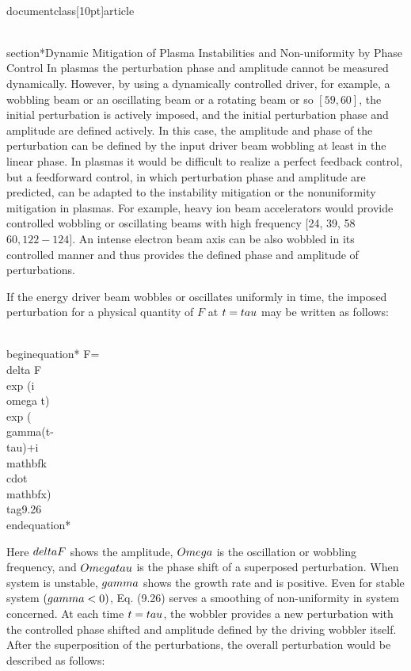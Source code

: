 \\documentclass[10pt]{article}
\begin{document}
{{{{{{\\section*{Dynamic Mitigation of Plasma Instabilities and Non-uniformity by Phase Control}
In plasmas the perturbation phase and amplitude cannot be measured dynamically. However, by using a dynamically controlled driver, for example, a wobbling beam or an oscillating beam or a rotating beam or so $[59,60]$, the initial perturbation is actively imposed, and the initial perturbation phase and amplitude are defined actively. In this case, the amplitude and phase of the perturbation can be defined by the input driver beam wobbling at least in the linear phase. In plasmas it would be difficult to realize a perfect feedback control, but a feedforward control, in which perturbation phase and amplitude are predicted, can be adapted to the instability mitigation or the nonuniformity mitigation in plasmas. For example, heavy ion beam accelerators would provide controlled wobbling or oscillating beams with high frequency [24, 39, 58$60,122-124]$. An intense electron beam axis can be also wobbled in its controlled manner and thus provides the defined phase and amplitude of perturbations.

If the energy driver beam wobbles or oscillates uniformly in time, the imposed perturbation for a physical quantity of $F$ at $t=\\tau$ may be written as follows:


\\begin{equation*}
F=\\delta F \\exp (i \\omega t) \\exp (\\gamma(t-\\tau)+i \\mathbf{k} \\cdot \\mathbf{x}) \\tag{9.26}
\\end{equation*}


Here $\\delta F$ shows the amplitude, $\\Omega$ is the oscillation or wobbling frequency, and $\\Omega \\tau$ is the phase shift of a superposed perturbation. When system is unstable, $\\gamma$ shows the growth rate and is positive. Even for stable system $(\\gamma<0)$, Eq. (9.26) serves a smoothing of non-uniformity in system concerned. At each time $t=\\tau$, the wobbler provides a new perturbation with the controlled phase shifted and amplitude defined by the driving wobbler itself. After the superposition of the perturbations, the overall perturbation would be described as follows:


}}}}}}
\end{document}
